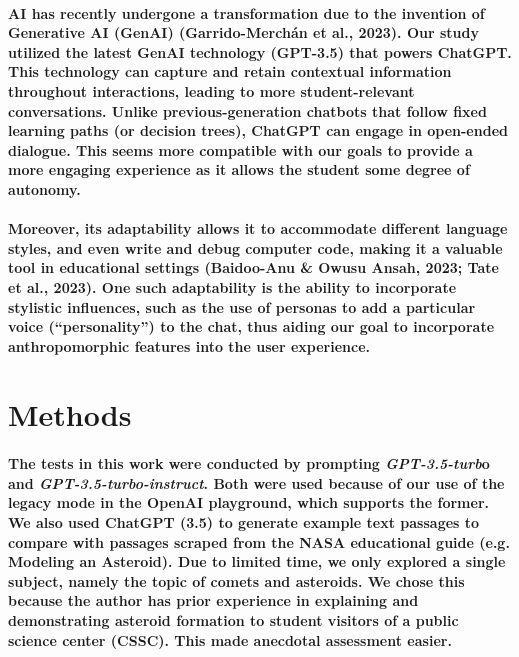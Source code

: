 \documentclass{article}
\begin{document}
\paragraph{AI has recently undergone a transformation due to the invention of Generative AI (GenAI) (Garrido-Merchán et al., 2023). Our study utilized the latest GenAI technology (GPT-3.5) that powers ChatGPT. This technology can capture and retain contextual information throughout interactions, leading to more student-relevant conversations. Unlike previous-generation chatbots that follow fixed learning paths (or decision trees), ChatGPT can engage in open-ended dialogue. This seems more compatible with our goals to provide a more engaging experience as it allows the student some degree of autonomy.}

\paragraph{Moreover, its adaptability allows it to accommodate different language styles, and even write and debug computer code, making it a valuable tool in educational settings (Baidoo-Anu \& Owusu Ansah, 2023; Tate et al., 2023). One such adaptability is the ability to incorporate stylistic influences, such as the use of personas to add a particular voice (“personality”) to the chat, thus aiding our goal to incorporate anthropomorphic features into the user experience.}

\newpage

\section*{Methods}

\paragraph{The tests in this work were conducted by prompting \textit{GPT-3.5-turb}o and \textit{GPT-3.5-turbo-instruct}. Both were used because of our use of the legacy mode in the OpenAI playground, which supports the former. We also used ChatGPT (3.5) to generate example text passages to compare with passages scraped from the NASA educational guide (e.g. Modeling an Asteroid). Due to limited time, we only explored a single subject, namely the topic of comets and asteroids. We chose this because the author has prior experience in explaining and demonstrating asteroid formation to student visitors of a public science center (CSSC). This made anecdotal assessment easier.}
\end{document}
